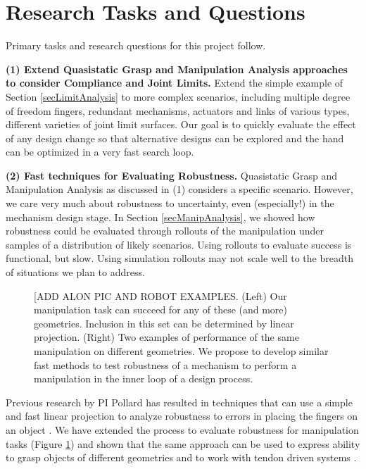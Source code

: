 \section{Research Tasks and Questions}
  \label{secQuestions}

Primary tasks and research questions for this project follow.

\smallskip\noindent
{\bf (1) Extend Quasistatic Grasp and Manipulation Analysis approaches to consider Compliance and Joint Limits.}  Extend the simple example of Section \ref{secLimitAnalysis} to more complex scenarios, including multiple degree of freedom fingers, redundant mechanisms, actuators and links of various types, different varieties of joint limit surfaces.   Our goal is to quickly evaluate the effect of any design change so that alternative designs can be explored and the hand can be optimized in a very fast search loop.

\smallskip\noindent
{\bf (2) Fast techniques for Evaluating Robustness.}   Quasistatic Grasp and Manipulation Analysis as discussed in (1) considers a specific scenario.   However, we care very much about robustness to uncertainty, even (especially!) in the mechanism design stage.  In Section \ref{secManipAnalysis}, we showed how robustness could be evaluated through rollouts of the manipulation under samples of a distribution of likely scenarios.   Using rollouts to evaluate success is functional, but slow.    Using simulation rollouts may not scale well to the breadth of situations we plan to address.

\begin{figure}
\begin{center}
\vspace*{2in}
\end{center}
\caption[]{[ADD ALON PIC AND ROBOT EXAMPLES.  (Left) Our manipulation task can succeed for any of these (and more) geometries.   Inclusion in this set can be determined by linear projection.   (Right) Two examples of performance of the same manipulation on different geometries.   We propose to develop similar fast methods to test robustness of a mechanism to perform a manipulation in the inner loop of a design process.}
\label{AlonManip}
\end{figure}


Previous research by PI Pollard has resulted in techniques that can use a simple and fast linear projection to analyze robustness to errors in placing the fingers on an object \cite{pollard2004closure}.   We have extended the process to evaluate robustness for manipulation tasks \cite{Pollard:WAFR02} (Figure \ref{AlonManip}) and shown that the same approach can be used to express ability to grasp objects of different geometries \cite{pollard20045} and to work with tendon driven systems \cite{Li:graspDB07}.

